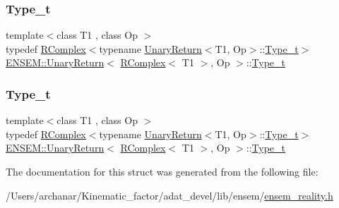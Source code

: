 \subsubsection{\texorpdfstring{Type\_t}{Type\_t}\hspace{0.1cm}{\footnotesize\ttfamily [1/2]}}
{\footnotesize\ttfamily template$<$class T1 , class Op $>$ \\
typedef \mbox{\hyperlink{classENSEM_1_1RComplex}{R\+Complex}}$<$typename \mbox{\hyperlink{structENSEM_1_1UnaryReturn}{Unary\+Return}}$<$T1, Op$>$\+::\mbox{\hyperlink{structENSEM_1_1UnaryReturn_3_01RComplex_3_01T1_01_4_00_01Op_01_4_ac02d831030bfab6627f041d352dbbe95}{Type\+\_\+t}}$>$ \mbox{\hyperlink{structENSEM_1_1UnaryReturn}{E\+N\+S\+E\+M\+::\+Unary\+Return}}$<$ \mbox{\hyperlink{classENSEM_1_1RComplex}{R\+Complex}}$<$ T1 $>$, Op $>$\+::\mbox{\hyperlink{structENSEM_1_1UnaryReturn_3_01RComplex_3_01T1_01_4_00_01Op_01_4_ac02d831030bfab6627f041d352dbbe95}{Type\+\_\+t}}}

\mbox{\label{structENSEM_1_1UnaryReturn_3_01RComplex_3_01T1_01_4_00_01Op_01_4_ac02d831030bfab6627f041d352dbbe95}} 
\subsubsection{\texorpdfstring{Type\_t}{Type\_t}\hspace{0.1cm}{\footnotesize\ttfamily [2/2]}}
{\footnotesize\ttfamily template$<$class T1 , class Op $>$ \\
typedef \mbox{\hyperlink{classENSEM_1_1RComplex}{R\+Complex}}$<$typename \mbox{\hyperlink{structENSEM_1_1UnaryReturn}{Unary\+Return}}$<$T1, Op$>$\+::\mbox{\hyperlink{structENSEM_1_1UnaryReturn_3_01RComplex_3_01T1_01_4_00_01Op_01_4_ac02d831030bfab6627f041d352dbbe95}{Type\+\_\+t}}$>$ \mbox{\hyperlink{structENSEM_1_1UnaryReturn}{E\+N\+S\+E\+M\+::\+Unary\+Return}}$<$ \mbox{\hyperlink{classENSEM_1_1RComplex}{R\+Complex}}$<$ T1 $>$, Op $>$\+::\mbox{\hyperlink{structENSEM_1_1UnaryReturn_3_01RComplex_3_01T1_01_4_00_01Op_01_4_ac02d831030bfab6627f041d352dbbe95}{Type\+\_\+t}}}



The documentation for this struct was generated from the following file\+:\begin{DoxyCompactItemize}
\item 
/\+Users/archanar/\+Kinematic\+\_\+factor/adat\+\_\+devel/lib/ensem/\mbox{\hyperlink{lib_2ensem_2ensem__reality_8h}{ensem\+\_\+reality.\+h}}\end{DoxyCompactItemize}
